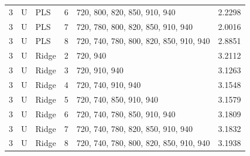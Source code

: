 \documentclass[10pt,a4paper]{article}
\begin{document}
\begin{landscape}
\begin{longtable}{rllrlr}
3 & U & PLS & 6 & 720, 800, 820, 850, 910, 940 & 2.2298 \\
3 & U & PLS & 7 & 720, 780, 800, 820, 850, 910, 940 & 2.0016 \\
3 & U & PLS & 8 & 720, 740, 780, 800, 820, 850, 910, 940 & 2.8851 \\
3 & U & Ridge & 2 & 720, 940 & 3.2112 \\
3 & U & Ridge & 3 & 720, 910, 940 & 3.1263 \\
3 & U & Ridge & 4 & 720, 740, 910, 940 & 3.1548 \\
3 & U & Ridge & 5 & 720, 740, 850, 910, 940 & 3.1579 \\
3 & U & Ridge & 6 & 720, 740, 780, 850, 910, 940 & 3.1809 \\
3 & U & Ridge & 7 & 720, 740, 780, 820, 850, 910, 940 & 3.1832 \\
3 & U & Ridge & 8 & 720, 740, 780, 800, 820, 850, 910, 940 & 3.1938 \\
\end{longtable}
\endgroup
\end{landscape}
\end{document}
